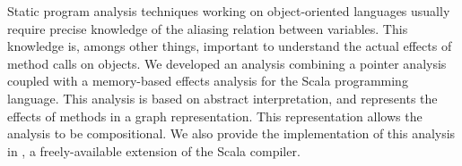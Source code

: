 Static program analysis techniques working on object-oriented languages usually
require precise knowledge of the aliasing relation between variables. This
knowledge is, amongs other things, important to understand the actual effects
of method calls on objects. We developed an analysis combining a pointer analysis
coupled with a memory-based effects analysis for the Scala programming
language. This analysis is based on abstract interpretation, and represents the
effects of methods in a graph representation. This representation allows the
analysis to be compositional. We also provide the implementation of this
analysis in \insane, a freely-available extension of the Scala compiler.
